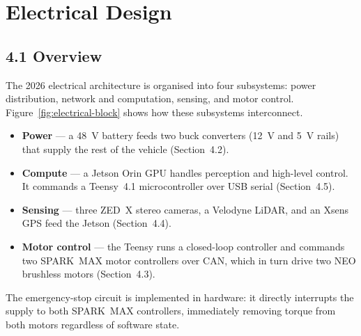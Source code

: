 \documentclass[11pt]{article}
\begin{document}
\section*{Electrical Design}

\subsection*{4.1 Overview}
The 2026 electrical architecture is organised into four subsystems: power
distribution, network and computation, sensing, and motor control.
Figure~\ref{fig:electrical-block} shows how these subsystems interconnect.

\begin{itemize}
  \item \textbf{Power} — a 48~V battery feeds two buck converters (12~V and 5~V
    rails) that supply the rest of the vehicle (Section~4.2).
  \item \textbf{Compute} — a Jetson Orin GPU handles perception and high-level
    control. It commands a Teensy~4.1 microcontroller over USB serial
    (Section~4.5).
  \item \textbf{Sensing} — three ZED~X stereo cameras, a Velodyne LiDAR, and an
    Xsens GPS feed the Jetson (Section~4.4).
  \item \textbf{Motor control} — the Teensy runs a closed-loop controller and
    commands two SPARK~MAX motor controllers over CAN, which in turn drive
    two NEO brushless motors (Section~4.3).
\end{itemize}

The emergency-stop circuit is implemented in hardware: it directly interrupts
the supply to both SPARK~MAX controllers, immediately removing torque from
both motors regardless of software state.
\end{document}
